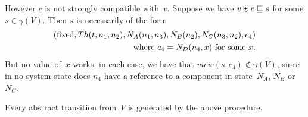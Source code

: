 However $c$ is not strongly compatible with~$v$.  Suppose we have \( v \uplus
c \sqsubseteq s \) for some $s \in \gamma(V)$.  Then $s$ is necessarily of the form
\[
\begin{align}
(\mathrm{fixed}, Th(t,n_1,n_2), N_A(n_1, n_3), N_B(n_2), N_C(n_3,n_2), c_4) \\
\qquad \mbox{where $c_4 = N_D(n_4,x)$ for some $x$.}
\end{align}
\]
But no value of~$x$ works: in each case, we have that $view(s, c_4) \nin
\gamma(V)$, since in no system state does $n_4$ have a reference to a
component in state~$N_A$, $N_B$ or~$N_C$.



\begin{lemma}
Every abstract transition from~$V$ is generated by the above procedure.
\end{lemma}

